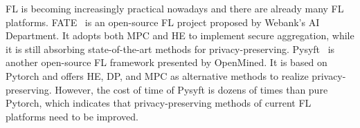 FL is becoming increasingly practical nowadays and there are already many FL platforms. FATE~\cite{fate} is an open-source FL project proposed by Webank’s AI Department. It adopts both MPC and HE to implement secure aggregation, while it is still absorbing state-of-the-art methods for privacy-preserving. Pysyft~\cite{pysyft} is another open-source FL framework presented by OpenMined. It is based on Pytorch and offers HE, DP, and MPC as alternative methods to realize privacy-preserving. However, the cost of time of Pysyft is dozens of times than pure Pytorch, which indicates that privacy-preserving methods of current FL platforms need to be improved.